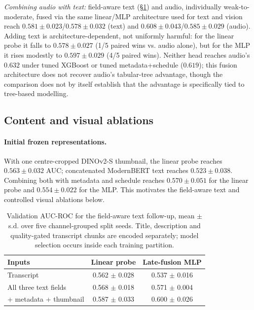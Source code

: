 \documentclass[letterpaper]{article}
\newif\ifdraft\draftfalse         %
\newcommand{\note}[2]{\ifdraft{\small\textcolor{red}{[\textbf{#1}: #2]}}\fi}
\begin{document}
\emph{Combining audio with text:} field-aware text (\S\ref{tab:textv2}) and audio, individually weak-to-moderate, fused via the same linear/MLP architecture used for text and vision reach $0.581\pm0.023$/$0.578\pm0.032$ (text) and $0.608\pm0.043$/$0.585\pm0.029$ (audio). Adding text is architecture-dependent, not uniformly harmful: for the linear probe it falls to $0.578\pm0.027$ (1/5 paired wins vs. audio alone), but for the MLP it rises modestly to $0.597\pm0.029$ (4/5 paired wins). Neither head reaches audio's $0.632$ under tuned XGBoost or tuned metadata+schedule ($0.619$); this fusion architecture does not recover audio's tabular-tree advantage, though the comparison does not by itself establish that the advantage is specifically tied to tree-based modelling. \note{PROVISIONAL}{Hypothesis test, not a search; it failed to beat the tuned structured comparator. Does not change the frozen finalist or the audio-ablation finding.}

\subsection{Content and visual ablations}

\paragraph{Initial frozen representations.} With one centre-cropped DINOv2-S thumbnail, the linear probe reaches $0.563\pm0.032$ AUC; concatenated ModernBERT text reaches $0.523\pm0.038$. Combining both with metadata and schedule reaches $0.570\pm0.051$ for the linear probe and $0.554\pm0.022$ for the MLP. This motivates the field-aware text and controlled visual ablations below.

\begin{table}[t]
\centering
\small
\begin{tabular}{l cc}
\toprule
Inputs & Linear probe & Late-fusion MLP \\
\midrule
Transcript & 0.562 \tiny{$\pm$ 0.028} & 0.537 \tiny{$\pm$ 0.016} \\
All three text fields & 0.568 \tiny{$\pm$ 0.018} & 0.571 \tiny{$\pm$ 0.004} \\
+ metadata + thumbnail & 0.587 \tiny{$\pm$ 0.033} & 0.600 \tiny{$\pm$ 0.026} \\
\bottomrule
\end{tabular}
\caption{Validation AUC-ROC for the field-aware text follow-up, mean $\pm$ s.d. over five channel-grouped split seeds. Title, description and quality-gated transcript chunks are encoded separately; model selection occurs inside each training partition.}
\label{tab:textv2}
\end{table}
\end{document}

